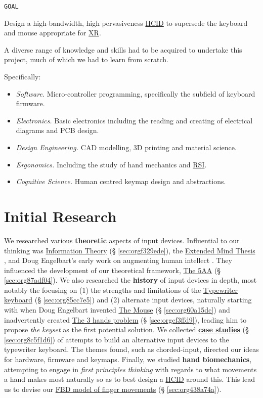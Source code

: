 \documentclass[logo,bsc,singlespacing,parskip]{infthesis}
\begin{document}
\begin{mdframed}
\begin{description}
\item[{\texttt{GOAL}}] 
\end{description}

Design a high-bandwidth, high pervasiveness \hyperref[orgf95a76e]{HCID} to supersede the keyboard and mouse appropriate for \hyperref[org88b0f70]{XR}.
\end{mdframed}

A diverse range of knowledge and skills had to be acquired to undertake this project, much of which we had to learn from scratch.

Specifically:
\begin{itemize}
\item \emph{Software.} Micro-controller programming, specifically the subfield of keyboard firmware.
\item \emph{Electronics.} Basic electronics including the reading and creating of electrical diagrams and PCB design.
\item \emph{Design Engineering.} CAD modelling, 3D printing and material science.
\item \emph{Ergonomics.} Including the study of hand mechanics and \hyperref[org503fc2d]{RSI}.
\item \emph{Cognitive Science.} Human centred keymap design and abstractions.
\end{itemize}
\chapter{Initial Research}
\label{sec:orgfd974be}
We researched various \textbf{theoretic} aspects of input devices.
Influential to our thinking was \hyperref[sec:orgf329ede]{Information Theory} (§ \ref{sec:orgf329ede}), the \hyperref[extended mind thesis]{Extended Mind Thesis} \autocite{ExtendedMindAndy}, and Doug Engelbart's early work on augmenting human intellect \autocite{engelbartAugmentingHumanIntellect1962}.
They influenced the development of our theoretical framework, \hyperref[sec:org87adf04]{The 5AA} (§ \ref{sec:org87adf04}).
We also researched the \textbf{history} of input devices in depth, most notably the focusing on (1) the strengths and limitations of the \hyperref[sec:org85cc7e5]{Typewriter keyboard} (§ \ref{sec:org85cc7e5}) and (2) alternate input devices, naturally starting with when Doug Engelbart invented \hyperref[sec:org60a15dc]{The Mouse} (§ \ref{sec:org60a15dc}) and inadvertently created \hyperref[sec:orgcf3ffd9]{The 3 hands problem} (§ \ref{sec:orgcf3ffd9}), leading him to propose \emph{the keyset} as the first potential solution.
We collected \hyperref[sec:org8c5f1d6]{\textbf{case studies}} (§ \ref{sec:org8c5f1d6}) of attempts to build an alternative input devices to the typewriter keyboard.
The themes found, such as chorded-input, directed our ideas for hardware, firmware and keymaps.
Finally, we studied \textbf{hand biomechanics}, attempting to engage in \emph{first principles thinking} with regards to what movements a hand makes most naturally so as to best design a \hyperref[orgf95a76e]{HCID} around this.
This lead us to devise our \hyperref[sec:org438a74a]{FBD model of finger movements} (§ \ref{sec:org438a74a}).
\end{document}
